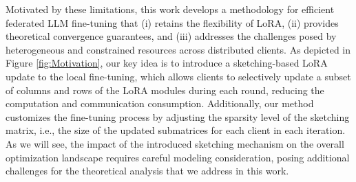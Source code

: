 \documentclass{article} %
\theoremstyle{plain}
\theoremstyle{definition}
\begin{document}
Motivated by these limitations, this work develops a methodology for efficient federated LLM fine-tuning that (i) retains the flexibility of LoRA, (ii) provides theoretical convergence guarantees, and (iii) addresses the challenges posed by heterogeneous and constrained resources across distributed clients. As depicted in Figure \ref{fig:Motivation}, our key idea is to introduce a sketching-based LoRA update to the local fine-tuning, which allows clients to selectively update a subset of columns and rows of the LoRA modules during each round, reducing the computation and communication consumption. Additionally, our method customizes the fine-tuning process by adjusting the sparsity level of the sketching matrix, i.e., the size of the updated submatrices for each client in each iteration. As we will see, the impact of the introduced sketching mechanism on the overall optimization landscape requires careful modeling consideration, posing additional challenges for the theoretical analysis that we address in this work.
\end{document}
